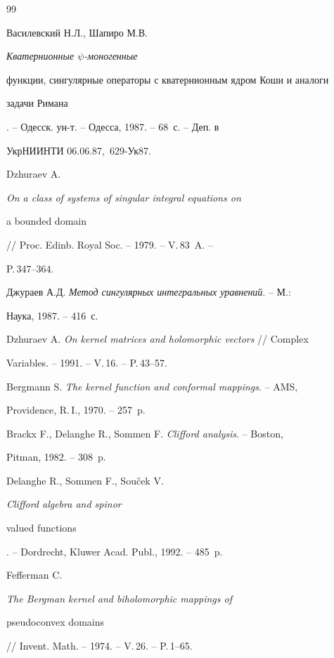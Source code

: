 \begin{thebibliography}{99} 


 




Василевский Н.Л., Шапиро М.В. {\em Кватернионные $\psi$-моногенные 


функции, сингулярные операторы с кватернионным ядром Коши и аналоги 


задачи Римана}. -- Одесск. ун-т. -- Одесса, 1987. -- 68~с. -- Деп. в 


УкрНИИНТИ 06.06.87, \No\,629-Ук87. 




Dzhuraev A. {\em On a class of systems of singular integral equations on 


a bounded domain} // Proc. Edinb. Royal Soc. -- 1979. -- V.\,83~A. -- 


P.\,347--364. 




Джураев А.Д. {\em Метод сингулярных интегральных уравнений}. -- М.: 


Наука, 1987. -- 416~с. 




Dzhuraev A. {\em On kernel matrices and holomorphic vectors} // Complex 


Variables. -- 1991. -- V.\,16. -- P.\,43--57. 




Bergmann S. {\em The kernel function and conformal mappings}. -- AMS, 


Providence, R.\,I., 1970. -- 257~p.




Brackx F., Delanghe R., Sommen F. {\em Clifford analysis}. -- Boston, 


Pitman, 1982. -- 308~p.




Delanghe R., Sommen F., Sou\v{c}ek V. {\em Clifford algebra and spinor 


valued functions}. -- Dordrecht, Kluwer Acad. Publ., 1992. -- 485~p.




Fefferman C. {\em The Bergman kernel and biholomorphic mappings of 


pseudoconvex domains} // Invent. Math. -- 1974. -- V.\,26. -- P.\,1--65. 





\end{thebibliography}
